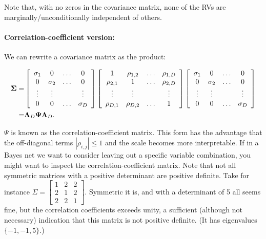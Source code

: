 Note that, with no zeros in the covariance matrix, none of the RVs
are marginally/unconditionally independent of others.


\paragraph{Correlation-coefficient version:\protect \\
\label{par:corr_coef_form}}

We can rewrite a covariance matrix as the product:

\begin{align}
  {\mathbf\Sigma}
  =&
  \left[
    \begin{array}{cccc}
      \sigma_1 & 0 & \ldots & 0 \\
      0 & \sigma_2 &\ldots & 0 \\
      \vdots & \vdots & & \vdots \\
      0 & 0 & \ldots & \sigma_D
    \end{array}
  \right]
  \left[
    \begin{array}{cccc}
      1 & \rho_{1,2} & \ldots & \rho_{1,D} \\
      \rho_{2,1} & 1 & \ldots & \rho_{2,D} \\
      \vdots & \vdots & & \vdots \\
      \rho_{D,1} & \rho_{D,2} & \ldots & 1
    \end{array}
  \right]
  \left[
    \begin{array}{cccc}
      \sigma_1 & 0 & \ldots & 0 \\
      0 & \sigma_2 &\ldots & 0 \\
      \vdots & \vdots & & \vdots \\
      0 & 0 & \ldots & \sigma_D
    \end{array}
  \right] \nonumber\\
  =& {\mathbf\Lambda}_D {\mathbf\Psi} {\mathbf\Lambda}_D. \label{eq:corrcoef}
\end{align}

$\Psi$ is known as the correlation-coefficient matrix. This form
has the advantage that the off-diagonal terms $|\rho_{i,j}|\leq1$
and the scale becomes more interpretable. If in a Bayes net we want
to consider leaving out a specific variable combination, you might
want to inspect the correlation-coefficient matrix. Note that not
all symmetric matrices with a positive determinant are positive definite.
Take for instance $\Sigma=\left[\begin{array}{rrr}
1 & 2 & 2\\
2 & 1 & 2\\
2 & 2 & 1
\end{array}\right].$ Symmetric it is, and with a determinant of 5 all seems fine, but
the correlation coefficients exceeds unity, a sufficient (although
not necessary) indication that this matrix is not positive definite.
(It has eigenvalues $\{-1,-1,5\}$.)


